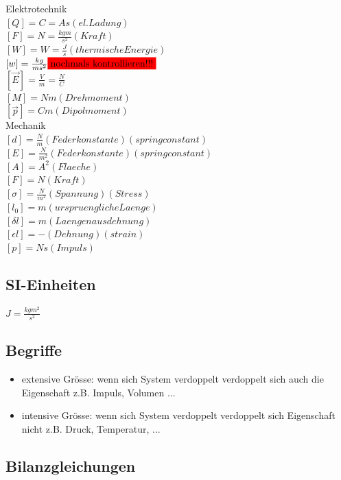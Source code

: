\documentclass[a4paper]{scrartcl}
\begin{document}
Elektrotechnik\\
$ [Q]=C=As (el. Ladung)$\\
$ [F]=N=\frac{kg m}{s^2} (Kraft)$\\
$ [W]=W=\frac{J}{s} (thermische Energie)$\\
$ [w]=\frac{kg}{ms^2} \colorbox{red}{nochmals kontrollieren!!!} $\\
$ [\vec E]=\frac{V}{m} = \frac{N}{C}$\\
$ [M]=Nm (Drehmoment)$\\
$ [\vec p]=Cm (Dipolmoment)$\\

Mechanik\\
$ [d]=\frac{N}{m} (Federkonstante)(spring constant)$\\
$ [E]=\frac{N}{m^2} (Federkonstante)(spring constant)$\\
$ [A]=A^2 (Flaeche)$\\
$ [F]=N (Kraft)$\\
$ [\sigma]=\frac{N}{m^2} (Spannung)(Stress)$\\
$ [l_0]=m (urspruengliche Laenge)$\\
$ [\delta l]=m (Laengenausdehnung)$\\
$ [\epsilon l]=- (Dehnung)(strain)$\\
$ [p]=Ns (Impuls)$\\



\subsection{SI-Einheiten}
$ J = \frac{kg m^2}{s^2} $\\

\subsection{Begriffe}
\begin{itemize}
\item extensive Grösse: wenn sich System verdoppelt verdoppelt sich auch die Eigenschaft z.B. Impuls, Volumen ...
\item intensive Grösse: wenn sich System verdoppelt verdoppelt sich Eigenschaft nicht z.B. Druck, Temperatur, ...
\end{itemize}


\subsection{Bilanzgleichungen}
\end{document}
